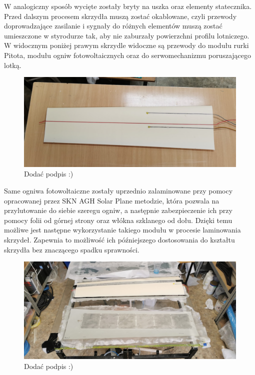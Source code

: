 \documentclass[12pt, a4paper]{article}
\begin{document}
W analogiczny sposób wycięte zostały bryty na uszka oraz elementy statecznika. Przed dalszym procesem skrzydła muszą zostać okablowane, czyli przewody doprowadzające zasilanie i sygnały do różnych elementów muszą zostać umieszczone w styrodurze tak, aby nie zaburzały powierzchni profilu lotniczego. W widocznym poniżej prawym skrzydle widoczne są przewody do modułu rurki Pitota, modułu ogniw fotowoltaicznych oraz do serwomechanizmu poruszającego lotką.
 \begin{figure}[ht]
    \centering
    \includegraphics[width=1\textwidth]{okablowany}
    \caption{Dodać podpis :)}
\end{figure}
Same ogniwa fotowoltaiczne zostały uprzednio zalaminowane przy pomocy opracowanej przez SKN AGH Solar Plane metodzie, która pozwala na przylutowanie do siebie szeregu ogniw, a następnie zabezpieczenie ich przy pomocy folii od górnej strony oraz włókna szklanego od dołu. Dzięki temu możliwe jest następne wykorzystanie takiego modułu w procesie laminowania skrzydeł. Zapewnia to możliwość ich późniejszego dostosowania do kształtu skrzydła bez znaczącego spadku sprawności.
 \begin{figure}[ht]
    \centering
    \includegraphics[width=1\textwidth]{budowa7}
    \caption{Dodać podpis :)}
\end{figure}
\end{document}
